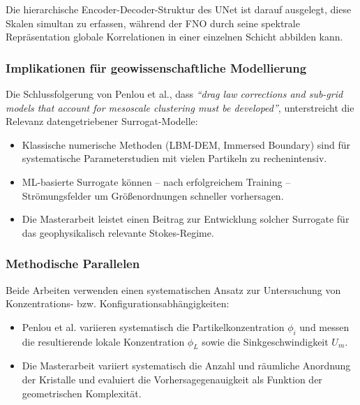 \documentclass[a4paper,12pt]{article}
\begin{document}
Die hierarchische Encoder-Decoder-Struktur des UNet ist darauf ausgelegt, diese Skalen simultan zu erfassen, w\"ahrend der FNO durch seine spektrale Repr\"asentation globale Korrelationen in einer einzelnen Schicht abbilden kann.

\subsubsection*{Implikationen für geowissenschaftliche Modellierung}
Die Schlussfolgerung von Penlou et al., dass \textit{``drag law corrections and sub-grid models that account for mesoscale clustering must be developed''}, unterstreicht die Relevanz datengetriebener Surrogat-Modelle:
\begin{itemize}
    \item Klassische numerische Methoden (LBM-DEM, Immersed Boundary) sind f\"ur systematische Parameterstudien mit vielen Partikeln zu rechenintensiv.
    \item ML-basierte Surrogate k\"onnen -- nach erfolgreichem Training -- Str\"omungsfelder um Gr\"o\ss{}enordnungen schneller vorhersagen.
    \item Die Masterarbeit leistet einen Beitrag zur Entwicklung solcher Surrogate f\"ur das geophysikalisch relevante Stokes-Regime.
\end{itemize}

\subsubsection*{Methodische Parallelen}
Beide Arbeiten verwenden einen systematischen Ansatz zur Untersuchung von Konzentrations- bzw. Konfigurationsabh\"angigkeiten:
\begin{itemize}
    \item Penlou et al. variieren systematisch die Partikelkonzentration $\phi_i$ und messen die resultierende lokale Konzentration $\phi_L$ sowie die Sinkgeschwindigkeit $U_m$.
    \item Die Masterarbeit variiert systematisch die Anzahl und r\"aumliche Anordnung der Kristalle und evaluiert die Vorhersagegenauigkeit als Funktion der geometrischen Komplexit\"at.
\end{itemize}
\end{document}
